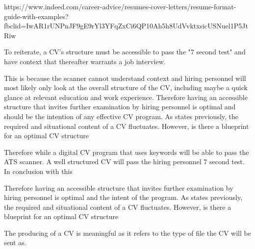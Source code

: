 https://www.indeed.com/career-advice/resumes-cover-letters/resume-format-guide-with-examples?fbclid=IwAR1rUNPnJF9gE9rYl3YFqZxCi6QP10Ah5h8UdVvktxsicUSNuel1P5JtRiw

 

To reiterate, a CV's structure must be accessible to pass the "7 second test" and have context that thereafter warrants a job interview. 





This is because the scanner cannot understand context and hiring personnel will most likely only look at the overall structure of the CV, including maybe a quick glance at relevant education and work experience.
Therefore having an accessible structure that invites further examination by hiring personnel is optimal and should be the intention of any effective CV program.
As states previously, the required and situational content of a CV fluctuates.
However, is there a blueprint for an optimal CV structure
{
Therefore while a digital CV program that uses keywords will be able to pass the ATS scanner.
A well structured CV will pass the hiring personnel 7 second test. 
In conclusion with this 

}
Therefore having an accessible structure that invites further examination by hiring personnel is optimal and the intent of the program.
As states previously, the required and situational content of a CV fluctuates.
However, is there a blueprint for an optimal CV structure


The producing of a CV is meaningful as it refers to the type of file the CV will be sent as.




